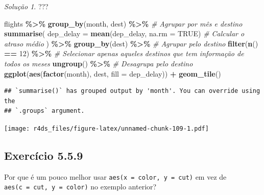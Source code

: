 \documentclass[
]{latex/krantz}
\newenvironment{Shaded}{\begin{snugshade}}{\end{snugshade}}
\newcommand{\AttributeTok}[1]{\textcolor[rgb]{0.13,0.29,0.53}{#1}}
\newcommand{\CommentTok}[1]{\textcolor[rgb]{0.56,0.35,0.01}{\textit{#1}}}
\newcommand{\ConstantTok}[1]{\textcolor[rgb]{0.56,0.35,0.01}{#1}}
\newcommand{\DecValTok}[1]{\textcolor[rgb]{0.00,0.00,0.81}{#1}}
\newcommand{\FunctionTok}[1]{\textcolor[rgb]{0.13,0.29,0.53}{\textbf{#1}}}
\newcommand{\NormalTok}[1]{#1}
\newcommand{\SpecialCharTok}[1]{\textcolor[rgb]{0.81,0.36,0.00}{\textbf{#1}}}
\theoremstyle{definition}
\theoremstyle{definition}
\theoremstyle{definition}
\theoremstyle{definition}
\theoremstyle{remark}
\newtheorem*{solution}{Solução}
\begin{document}
\begin{solution}
???

\begin{Shaded}
\begin{Highlighting}[]
\NormalTok{flights }\SpecialCharTok{\%\textgreater{}\%}
    \FunctionTok{group\_by}\NormalTok{(month, dest) }\SpecialCharTok{\%\textgreater{}\%}                           \CommentTok{\# Agrupar por mês e destino}
    \FunctionTok{summarise}\NormalTok{(}
        \AttributeTok{dep\_delay =} \FunctionTok{mean}\NormalTok{(dep\_delay, }\AttributeTok{na.rm =} \ConstantTok{TRUE}\NormalTok{)       }\CommentTok{\# Calcular o atraso médio}
\NormalTok{    ) }\SpecialCharTok{\%\textgreater{}\%}
    \FunctionTok{group\_by}\NormalTok{(dest) }\SpecialCharTok{\%\textgreater{}\%}                                  \CommentTok{\# Agrupar pelo destino}
    \FunctionTok{filter}\NormalTok{(}\FunctionTok{n}\NormalTok{() }\SpecialCharTok{==} \DecValTok{12}\NormalTok{) }\SpecialCharTok{\%\textgreater{}\%}                               \CommentTok{\# Selecionar apenas aqueles destinos que tem informação de todos os meses}
    \FunctionTok{ungroup}\NormalTok{() }\SpecialCharTok{\%\textgreater{}\%}                                       \CommentTok{\# Desagrupa pelo destino}
    \FunctionTok{ggplot}\NormalTok{(}\FunctionTok{aes}\NormalTok{(}\FunctionTok{factor}\NormalTok{(month), dest, }\AttributeTok{fill =}\NormalTok{ dep\_delay)) }\SpecialCharTok{+}
        \FunctionTok{geom\_tile}\NormalTok{()}
\end{Highlighting}
\end{Shaded}

\begin{verbatim}
## `summarise()` has grouped output by 'month'. You can override using the
## `.groups` argument.
\end{verbatim}

\texttt{[image: r4ds\_files/figure-latex/unnamed-chunk-109-1.pdf]}
\end{solution}

\hypertarget{exr5-5-9}{%
\subsection*{Exercício 5.5.9}\label{exr5-5-9}}

Por que é um pouco melhor usar \texttt{aes(x\ =\ color,\ y\ =\ cut)} em vez de \texttt{aes(c\ =\ cut,\ y\ =\ color)} no exemplo anterior?
\end{document}
